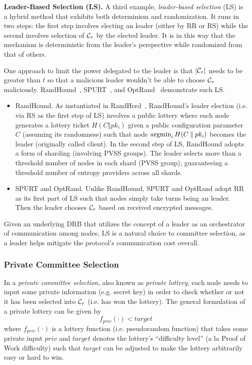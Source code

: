 \noindent\textbf{Leader-Based Selection (LS).} A third example, \textit{leader-based selection} (LS) is a hybrid method that exhibits both determinism and randomization. It runs in two steps: the first step involves electing an \epoch leader (either by RR or RS) while the second involves selection of $\mathcal{C}_\tau$ by the elected leader. It is in this way that the mechanism is deterministic from the leader's perspective while randomized from that of others.

One approach to limit the power delegated to the leader is that $|\mathcal{C}_\tau|$ needs to be greater than $t$ so that a malicious leader wouldn't be able to choose $\mathcal{C}_\tau$ maliciously. RandHound~\cite{syta2017scalable}, SPURT~\cite{das2021spurt}, and OptRand~\cite{bhat2022optrand} demonstrate such LS.
\begin{itemize}
\item RandHound. As instantiated in RandHerd~\cite{syta2017scalable}, RandHound's leader election (i.e. via RS as the first step of LS) involves a public lottery where each node generates a lottery ticket $H(C \mathbin\Vert pk_i)$ given a public configuration parameter $C$ (assuming its randomness) such that node $\operatorname*{argmin}_{i} H(C \mathbin\Vert pk_i)$ becomes the leader (originally called client). In the second step of LS, RandHound adopts a form of sharding (involving PVSS groups). The leader selects more than a threshold number of nodes in each shard (PVSS group), guaranteeing a threshold number of entropy providers across all shards.
\item SPURT and OptRand. Unlike RandHound, SPURT and OptRand adopt RR as its first part of LS such that nodes simply take turns being an \epoch leader. Then the leader chooses $\mathcal{C}_\tau$ based on received encrypted messages.
\end{itemize}

Given an underlying DRB that utilizes the concept of a leader as an orchestrator of communication among nodes, LS is a natural choice to committee selection, as a leader helps mitigate the protocol's communication cost overall.

\subsubsection{Private Committee Selection}
\label{subsubsection:private-committee-selection}
In a \textit{private committee selection}, also known as \textit{private lottery}, each node needs to input some private information (e.g. secret key) in order to check whether or not it has been selected into $\mathcal{C}_\tau$ (i.e. has won the lottery). The general formulation of a private lottery can be given by
\[
f_{priv}(\cdot) < target
\]
where $f_{priv}(\cdot)$ is a lottery function (i.e. pseudorandom function) that takes some private input $priv$ and $target$ denotes the lottery's ``difficulty level'' (a la Proof of Work difficulty) such that $target$ can be adjusted to make the lottery arbitrarily easy or hard to win.

